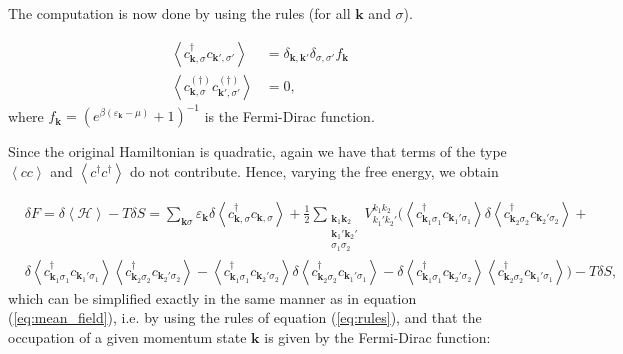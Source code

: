 The computation is now done by using the rules (for all $\bm k$ and $\sigma$).

\begin{equation}\label{eq:rules}
\begin{split}
\left\langle c_{\bm k, \sigma}^\dagger c_{\bm k', \sigma'} \right\rangle &= \delta_{\bm k, \bm k'} \delta_{\sigma, \sigma'} f_{\bm k} \\
\left\langle c_{\bm k, \sigma}^{(\dagger)} c_{\bm k', \sigma'}^{(\dagger)} \right\rangle &= 0 ,
\end{split}
\end{equation}
where $f_{\bm k} = (e^{\beta(\varepsilon_{\bm k} - \mu)} +1 )^{-1}$ is the Fermi-Dirac function.

Since the original Hamiltonian is quadratic, again we have that terms of the type $\left\langle cc \right\rangle$ and $\left\langle c^\dagger c^\dagger \right\rangle$ do not contribute. Hence, varying the free energy, we obtain

\begin{equation}
\begin{split}
&\delta F =  \delta \left\langle \mathcal{H} \right\rangle - T \delta S = \sum_{\bm k \sigma} \varepsilon_{\bm k} \delta \left\langle c_{\bm k, \sigma}^\dagger c_{\bm k, \sigma} \right\rangle + \frac{1}{2} \sum_{\substack{\bm k_1 \bm k_2 \\ \bm k_1' \bm k_2' \\  \sigma_1 \sigma_2}} V_{k_1' k_2'}^{k_1 k_2} \bigg( \left\langle c_{\bm k_1 \sigma_1}^\dagger c_{\bm k_1' \sigma_1} \right\rangle \delta  \left\langle c_{\bm k_2 \sigma_2}^\dagger c_{\bm k_2' \sigma_2} \right\rangle + \\
&\delta \left\langle c_{\bm k_1 \sigma_1}^\dagger c_{\bm k_1' \sigma_1} \right\rangle  \left\langle c_{\bm k_2 \sigma_2}^\dagger c_{\bm k_2' \sigma_2} \right\rangle  - \left\langle c_{\bm k_1 \sigma_1}^\dagger c_{\bm k_2' \sigma_2} \right\rangle  \delta \left\langle c_{\bm k_2 \sigma_2}^\dagger c_{\bm k_1' \sigma_1} \right\rangle - \delta \left\langle c_{\bm k_1 \sigma_1}^\dagger c_{\bm k_2' \sigma_2} \right\rangle  \left\langle c_{\bm k_2 \sigma_2}^\dagger c_{\bm k_1' \sigma_1} \right\rangle \bigg) - T \delta S ,
\end{split}
\end{equation}
which can be simplified exactly in the same manner as in equation (\ref{eq:mean_field}), i.e. by using the rules of equation (\ref{eq:rules}), and that the occupation of a given momentum state $\bm k$ is given by the Fermi-Dirac function:

